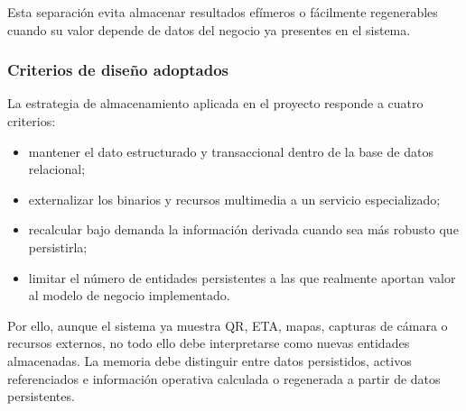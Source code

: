 Esta separación evita almacenar resultados efímeros o fácilmente regenerables cuando su valor depende de datos del negocio ya presentes en el sistema.

\subsubsection*{Criterios de diseño adoptados}

La estrategia de almacenamiento aplicada en el proyecto responde a cuatro criterios:

\begin{itemize}
    \item mantener el dato estructurado y transaccional dentro de la base de datos relacional;
    \item externalizar los binarios y recursos multimedia a un servicio especializado;
    \item recalcular bajo demanda la información derivada cuando sea más robusto que persistirla;
    \item limitar el número de entidades persistentes a las que realmente aportan valor al modelo de negocio implementado.
\end{itemize}

Por ello, aunque el sistema ya muestra QR, ETA, mapas, capturas de cámara o recursos externos, no todo ello debe interpretarse como nuevas entidades almacenadas. La memoria debe distinguir entre datos persistidos, activos referenciados e información operativa calculada o regenerada a partir de datos persistentes.
